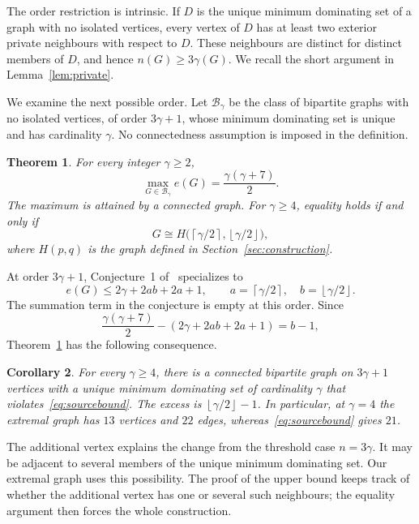 \documentclass[11pt]{article}
\newtheorem{theorem}{Theorem}[section]
\newtheorem{corollary}[theorem]{Corollary}
\theoremstyle{definition}
\theoremstyle{remark}
\newcommand{\e}{e}
\newcommand{\ceil}[1]{\left\lceil#1\right\rceil}
\newcommand{\floor}[1]{\left\lfloor#1\right\rfloor}
\begin{document}
The order restriction is intrinsic. If $D$ is the unique minimum dominating
set of a graph with no isolated vertices, every vertex of $D$ has at least two
exterior private neighbours with respect to $D$. These neighbours are distinct
for distinct members of $D$, and hence $n(G)\ge3\gamma(G)$. We recall the short
argument in Lemma~\ref{lem:private}.

We examine the next possible order. Let $\mathcal B_\gamma$ be the class of
bipartite graphs with no isolated vertices, of order $3\gamma+1$, whose minimum
dominating set is unique and has cardinality $\gamma$. No connectedness
assumption is imposed in the definition.

\begin{theorem}\label{thm:main}
For every integer $\gamma\ge2$,
\[
 \max_{G\in\mathcal B_\gamma}\e(G)=\frac{\gamma(\gamma+7)}2.
\]
The maximum is attained by a connected graph. For $\gamma\ge4$, equality holds
if and only if
\[
 G\cong H\bigl(\ceil{\gamma/2},\floor{\gamma/2}\bigr),
\]
where $H(p,q)$ is the graph defined in Section~\ref{sec:construction}.
\end{theorem}

At order $3\gamma+1$, Conjecture~1 of~\cite{KN} specializes to
\begin{equation}\label{eq:sourcebound}
 \e(G)\le 2\gamma+2ab+2a+1,
 \qquad a=\ceil{\gamma/2},\quad b=\floor{\gamma/2}.
\end{equation}
The summation term in the conjecture is empty at this order. Since
\begin{equation}\label{eq:gap}
 \frac{\gamma(\gamma+7)}2-(2\gamma+2ab+2a+1)=b-1,
\end{equation}
Theorem~\ref{thm:main} has the following consequence.

\begin{corollary}\label{cor:counter}
For every $\gamma\ge4$, there is a connected bipartite graph on $3\gamma+1$
vertices with a unique minimum dominating set of cardinality $\gamma$ that
violates~\eqref{eq:sourcebound}. The excess is $\floor{\gamma/2}-1$.
In particular, at $\gamma=4$ the extremal graph has $13$ vertices and $22$
edges, whereas~\eqref{eq:sourcebound} gives $21$.
\end{corollary}

The additional vertex explains the change from the threshold case $n=3\gamma$.
It may be adjacent to several members of the unique minimum dominating set.
Our extremal graph uses this possibility. The proof of the upper bound keeps
track of whether the additional vertex has one or several such neighbours;
the equality argument then forces the whole construction.
\end{document}
